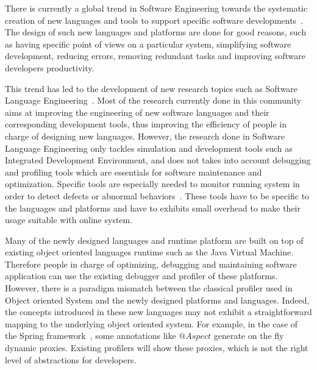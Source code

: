 
There is currently a global trend in Software Engineering towards the systematic creation of new languages and tools to support specific  software developments~\cite{van2000domain,hutchinson2011empirical}. 
The design of such new languages and platforms are done for good reasons, such as  having specific point of views on a particular system, simplifying software development, reducing errors, removing redundant tasks and improving software developers productivity. 

This trend has led to the development of new research topics such as Software Language Engineering~\cite{sle}. Most of the research currently done in this community aims at improving the engineering of new software languages and their corresponding development tools, thus improving the efficiency of people in charge of designing new languages. 
However, the research done in Software Language Engineering only tackles simulation and development tools such as Integrated Development Environment, and does not takes into account debugging and profiling tools which are essentials for software maintenance and optimization.
Specific tools are especially needed to monitor running system in order to detect defects or abnormal behaviors~\cite{duesterwald2000software,Jovic:2011:CMY:2076021.2048081}.
These tools have to be specific to the languages and platforms and have to exhibits small overhead to make their usage suitable with online system.

Many of the newly designed languages and runtime platform are built on top of existing object oriented languages runtime such as the Java Virtual Machine. 
Therefore people in charge of optimizing, debugging and maintaining software application can use the existing debugger and profiler of these platforms. 
However, there is a paradigm mismatch between the  classical profiler used in Object oriented System and the newly designed  platforms and languages. 
Indeed, the concepts introduced in these new languages may not exhibit a straightforward mapping to the underlying object oriented system. For example, in the case of the Spring framework~\cite{laddad2009aspectj}, some annotations like $@Aspect$ generate on the fly dynamic proxies. Existing profilers will show these proxies, which is not the right level of abstractions for developers. 



